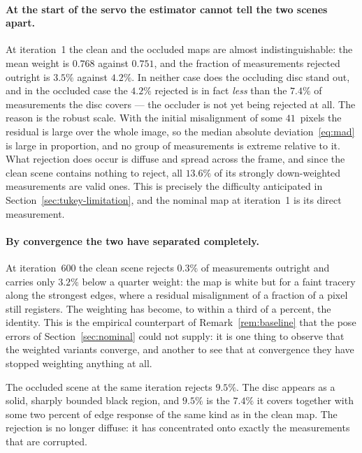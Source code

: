 \paragraph{At the start of the servo the estimator cannot tell the two scenes
apart.}
At iteration~1 the clean and the occluded maps are almost
indistinguishable: the mean weight is $0.768$ against $0.751$, and the
fraction of measurements rejected outright is $3.5\%$ against $4.2\%$. In
neither case does the occluding disc stand out, and in the occluded case the
$4.2\%$ rejected is in fact \emph{less} than the $7.4\%$ of measurements the
disc covers --- the occluder is not yet being rejected at all. The reason is
the robust scale. With the initial misalignment of some $41$~pixels the
residual is large over the whole image, so the median absolute
deviation~\eqref{eq:mad} is large in proportion, and no group of measurements
is extreme relative to it. What rejection does occur is diffuse and spread
across the frame, and since the clean scene contains nothing to reject, all
$13.6\%$ of its strongly down-weighted measurements are valid ones. This is
precisely the difficulty anticipated in Section~\ref{sec:tukey-limitation},
and the nominal map at iteration~1 is its direct measurement.

\paragraph{By convergence the two have separated completely.}
At iteration~600 the clean scene rejects $0.3\%$ of measurements outright and
carries only $3.2\%$ below a quarter weight: the map is white but for a faint
tracery along the strongest edges, where a residual misalignment of a fraction
of a pixel still registers. The weighting has become, to within a third of a
percent, the identity. This is the empirical counterpart of
Remark~\ref{rem:baseline} that the pose errors of Section~\ref{sec:nominal}
could not supply: it is one thing to observe that the weighted variants
converge, and another to see that at convergence they have stopped weighting
anything at all.

The occluded scene at the same iteration rejects $9.5\%$. The disc appears as
a solid, sharply bounded black region, and $9.5\%$ is the $7.4\%$ it covers
together with some two percent of edge response of the same kind as in the
clean map. The rejection is no longer diffuse: it has concentrated onto
exactly the measurements that are corrupted.

